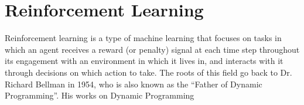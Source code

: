 \section{Reinforcement Learning}\label{sec:reinforcement_learning}

Reinforcement learning is a type of machine learning that focuses on tasks in which an agent receives a reward (or penalty) signal at each time step throughout its engagement with an environment in which it lives in, and interacts with it through decisions on which action to take. The roots of this field go back to Dr. Richard Bellman in 1954, who is also known as the ``Father of Dynamic Programming''. His works on Dynamic Programming \cite{Bellman1954,Bellman1957a}




